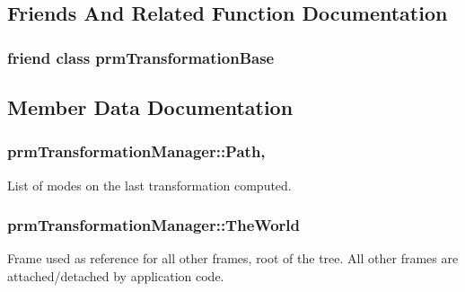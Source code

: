 \subsection{Friends And Related Function Documentation}
\hypertarget{classprm_transformation_manager_a1414bde07bd6dda93937227241d8b7ee}{}
\subsubsection[{prm\+Transformation\+Base}]{\setlength{\rightskip}{0pt plus 5cm}friend class {\bf prm\+Transformation\+Base}\hspace{0.3cm}{\ttfamily [friend]}}\label{classprm_transformation_manager_a1414bde07bd6dda93937227241d8b7ee}


\subsection{Member Data Documentation}
\hypertarget{classprm_transformation_manager_a5ca4de06a3cb7a5997b754f6f96da737}{}
\subsubsection[{Path}]{ prm\+Transformation\+Manager\+::\+Path\hspace{0.3cm}{\ttfamily [static]}, {\ttfamily [protected]}}\label{classprm_transformation_manager_a5ca4de06a3cb7a5997b754f6f96da737}
List of modes on the last transformation computed. \hypertarget{classprm_transformation_manager_a565dcc8b21bc6ffa31c62c638b540867}{}
\subsubsection[{The\+World}]{ prm\+Transformation\+Manager\+::\+The\+World\hspace{0.3cm}{\ttfamily [static]}}\label{classprm_transformation_manager_a565dcc8b21bc6ffa31c62c638b540867}
Frame used as reference for all other frames, root of the tree. All other frames are attached/detached by application code. \hypertarget{classprm_transformation_manager_a5e3fe611cb19ecfdfa5edaea3a7920b0}{}
